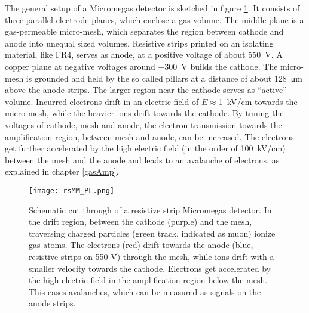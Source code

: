 \documentclass[
a4paper,                                %
twoside,                                %
BCOR1.4cm,                      %
10pt,                           %
headings=normal,                %
headsepline,                    %
clearplainpage, %
final,                                  %
div=14,
parskip=full,
openright,
bibliography=toc
]{scrreprt}
\begin{document}
The general setup of a Micromegas detector is sketched in figure \ref{mmprinciple}. It consists of three parallel electrode planes, which enclose a gas volume. The middle plane is a gas-permeable micro-mesh, which separates the region between cathode and anode into unequal sized volumes. Resistive strips printed on an isolating material, like FR4, serves as anode, at a positive voltage of about \SI{550}{V}. A copper plane at negative voltages around \SI{-300}{V} builds the cathode. The micro-mesh is grounded and held by the so called pillars at a distance of about \SI{128}{\micro\m} above the anode strips. The larger region near the cathode serves as ``active'' volume. Incurred electrons drift in an electric field of $E\approx$\SI{1}{kV/cm} towards the micro-mesh, while the heavier ions drift towards the cathode. By tuning the voltages of cathode, mesh and anode, the electron transmission towards the amplification region, between mesh and anode, can be increased. The electrons get further accelerated by the high electric field (in the order of \SI{100}{kV/cm}) between the mesh and the anode and leads to an avalanche of electrons, as explained in chapter \ref{gasAmp}.\cite{micromegas}

\begin{figure}[H]
	\centering
	\texttt{[image: rsMM\_PL.png]}
	\caption{Schematic cut through of a resistive strip Micromegas detector. In the drift region, between the cathode (purple) and the mesh, traversing charged particles (green track, indicated as muon) ionize gas atoms. The electrons (red) drift towards the anode (blue, resistive strips on 550 V) through the mesh, while ions drift with a smaller velocity towards the cathode. Electrons get accelerated by the high electric field in the amplification region below the mesh. This cases avalanches, which can be measured as signals on the anode strips. \cite{philippLthesis}}
	\label{mmprinciple}
\end{figure}
\end{document}
